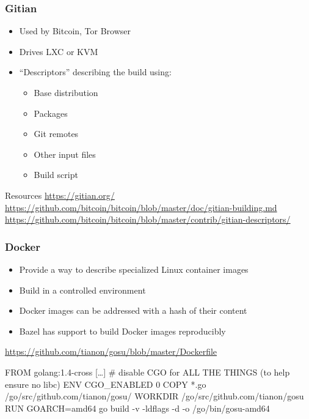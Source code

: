 \documentclass[14pt,aspectratio=169]{beamer}
\begin{document}
\begin{frame}
 \frametitle{Gitian}

 \begin{itemize}
  \item Used by Bitcoin, Tor Browser
  \item Drives LXC or KVM
  \item “Descriptors” describing the build using:
   \begin{itemize}
    \item Base distribution
    \item Packages
    \item Git remotes
    \item Other input files
    \item Build script
   \end{itemize}
 \end{itemize}

 \vfill
 \begin{block}{\footnotesize Resources}\footnotesize
 \url{https://gitian.org/}\\
 \url{https://github.com/bitcoin/bitcoin/blob/master/doc/gitian-building.md}\\
 \url{https://github.com/bitcoin/bitcoin/blob/master/contrib/gitian-descriptors/}
 \end{block}
\end{frame}

\begin{frame}[fragile]
 \frametitle{Docker}

 \begin{itemize}
  \item Provide a way to describe specialized Linux container images
  \item Build in a controlled environment
  \item Docker images can be addressed with a hash of their content
  \item Bazel has support to build Docker images reproducibly
 \end{itemize}

 \begin{block}{\footnotesize \url{https://github.com/tianon/gosu/blob/master/Dockerfile}}\footnotesize
\begin{semiverbatim}
FROM golang:1.4-cross
[…]
# disable CGO for ALL THE THINGS (to help ensure no libc)
ENV CGO\_ENABLED 0
COPY *.go /go/src/github.com/tianon/gosu/
WORKDIR /go/src/github.com/tianon/gosu
RUN GOARCH=amd64 go build -v -ldflags -d -o /go/bin/gosu-amd64
\end{semiverbatim}
 \end{block}
\end{frame}
\end{document}
